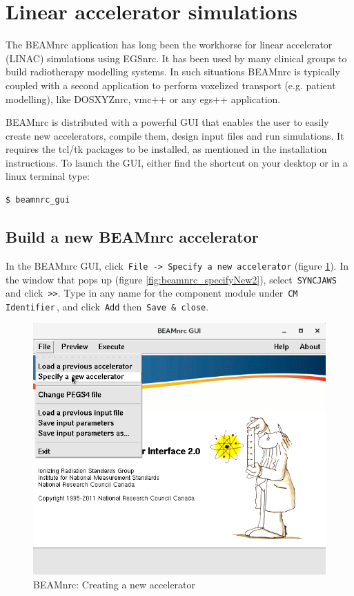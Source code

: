 \documentclass[12pt,twoside]{article}
\begin{document}
\clearpage
\section{Linear accelerator simulations}
The BEAMnrc application has long been the workhorse for linear accelerator (LINAC) simulations using EGSnrc. It has been used by many clinical groups to build radiotherapy modelling systems. In such situations BEAMnrc is typically coupled with a second application to perform voxelized transport (e.g. patient modelling), like DOSXYZnrc, vmc++ or any egs++ application.

BEAMnrc is distributed with a powerful GUI that enables the user to easily create new accelerators, compile them, design input files and run simulations. It requires the tcl/tk packages to be installed, as mentioned in the installation instructions. To launch the GUI, either find the shortcut on your desktop or in a linux terminal type:

\begin{lstlisting}
$ beamnrc_gui
\end{lstlisting}

\subsection{Build a new BEAMnrc accelerator}
In the BEAMnrc GUI, click \,\Verb|File -> Specify a new accelerator| (figure \ref{fig:beamnrc_specifyNew}). In the window that pops up (figure \ref{fig:beamnrc_specifyNew2}), select \,\Verb|SYNCJAWS|\, and click \,\Verb|>>|. Type in any name for the component module under \,\Verb|CM Identifier|\,, and click \,\Verb|Add| then \,\Verb|Save & close|.

\begin{figure}
\begin{center}
\includegraphics[width=5in]{figures/beamnrc_specifyNew}
\caption{BEAMnrc: Creating a new accelerator}
\label{fig:beamnrc_specifyNew}
\end{center}
\end{figure}
\end{document}
